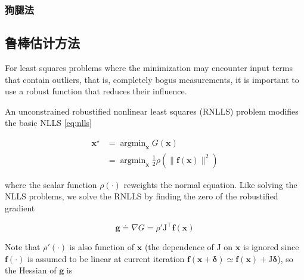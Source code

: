 \subsubsection*{狗腿法}

\subsection{鲁棒估计方法}

For least squares problems where the minimization may encounter input terms that contain outliers, that is, completely bogus measurements, it is important to use a robust function that reduces their influence\citep{ceres-solver}.

An unconstrained robustified nonlinear least squares (RNLLS) problem modifies the basic NLLS \eqref{eq:nlls}

\begin{equation}\label{eq:rnlls}
\begin{aligned}
    \bm{x}^\star &= \mathop{\arg\min}_{\bm{x}} G(\bm{x}) \\
                 &= \mathop{\arg\min}_{\bm{x}}
                    \frac{1}{2} \rho
                    \left( \lVert \mathbf{f}(\bm{x}) \rVert^2 \right)
\end{aligned}
\end{equation}

where the scalar function $\rho(\cdot)$ reweights the normal equation. Like solving the NLLS problems, we solve the RNLLS by finding the zero of the robustified gradient

\begin{equation}
    \bm{g} \doteq \nabla G = \rho' \mathrm{J}^\top \mathbf{f}(\bm{x})
\end{equation}

Note that $\rho'(\cdot)$ is also function of $\bm{x}$ (the dependence of $\mathrm{J}$ on $\bm{x}$ is ignored since $\mathbf{f}(\cdot)$ is assumed to be linear at current iteration $\mathbf{f}(\bm{x} + \bm{\delta}) \simeq \mathbf{f}(\bm{x}) + \mathrm{J}\bm{\delta}$), so the Hessian of $\bm{g}$ is

